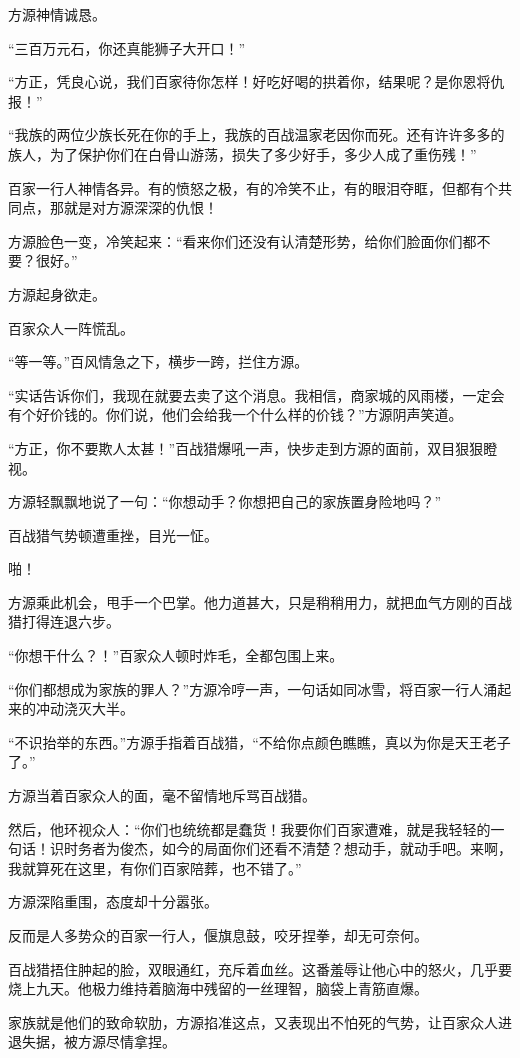 \begin{this_body}
方源神情诚恳。

“三百万元石，你还真能狮子大开口！”

“方正，凭良心说，我们百家待你怎样！好吃好喝的拱着你，结果呢？是你恩将仇报！”

“我族的两位少族长死在你的手上，我族的百战温家老因你而死。还有许许多多的族人，为了保护你们在白骨山游荡，损失了多少好手，多少人成了重伤残！”

百家一行人神情各异。有的愤怒之极，有的冷笑不止，有的眼泪夺眶，但都有个共同点，那就是对方源深深的仇恨！

方源脸色一变，冷笑起来：“看来你们还没有认清楚形势，给你们脸面你们都不要？很好。”

方源起身欲走。

百家众人一阵慌乱。

“等一等。”百风情急之下，横步一跨，拦住方源。

“实话告诉你们，我现在就要去卖了这个消息。我相信，商家城的风雨楼，一定会有个好价钱的。你们说，他们会给我一个什么样的价钱？”方源阴声笑道。

“方正，你不要欺人太甚！”百战猎爆吼一声，快步走到方源的面前，双目狠狠瞪视。

方源轻飘飘地说了一句：“你想动手？你想把自己的家族置身险地吗？”

百战猎气势顿遭重挫，目光一怔。

啪！

方源乘此机会，甩手一个巴掌。他力道甚大，只是稍稍用力，就把血气方刚的百战猎打得连退六步。

“你想干什么？！”百家众人顿时炸毛，全都包围上来。

“你们都想成为家族的罪人？”方源冷哼一声，一句话如同冰雪，将百家一行人涌起来的冲动浇灭大半。

“不识抬举的东西。”方源手指着百战猎，“不给你点颜色瞧瞧，真以为你是天王老子了。”

方源当着百家众人的面，毫不留情地斥骂百战猎。

然后，他环视众人：“你们也统统都是蠢货！我要你们百家遭难，就是我轻轻的一句话！识时务者为俊杰，如今的局面你们还看不清楚？想动手，就动手吧。来啊，我就算死在这里，有你们百家陪葬，也不错了。”

方源深陷重围，态度却十分嚣张。

反而是人多势众的百家一行人，偃旗息鼓，咬牙捏拳，却无可奈何。

百战猎捂住肿起的脸，双眼通红，充斥着血丝。这番羞辱让他心中的怒火，几乎要烧上九天。他极力维持着脑海中残留的一丝理智，脑袋上青筋直爆。

家族就是他们的致命软肋，方源掐准这点，又表现出不怕死的气势，让百家众人进退失据，被方源尽情拿捏。


\end{this_body}
